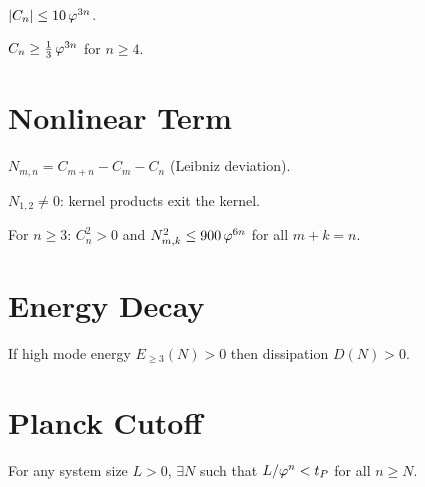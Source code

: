 \begin{theorem}
\label{thm:polynomial-growth}
$|C_n| \le 10\,\varphi^{3n}$.
\end{theorem}

\begin{theorem}
\label{thm:dissipation-lower-bound}
$C_n \ge \tfrac{1}{3}\,\varphi^{3n}$ for $n \ge 4$.
\end{theorem}

\section{Nonlinear Term}

\begin{definition}
\label{def:nonlinear-coeff}
$N_{m,n} = C_{m+n} - C_m - C_n$ (Leibniz deviation).
\end{definition}

\begin{theorem}
\label{thm:nonlinear-instability}
$N_{1,2} \ne 0$: kernel products exit the kernel.
\end{theorem}

\begin{theorem}
\label{thm:high-mode-dominance}
For $n \ge 3$: $C_n^2 > 0$ and $N_{m,k}^2 \le 900\,\varphi^{6n}$
for all $m + k = n$.
\end{theorem}

\section{Energy Decay}

\begin{theorem}
\label{thm:dissipation-strict-pos}
If high mode energy $E_{\ge 3}(N) > 0$ then
dissipation $D(N) > 0$.
\end{theorem}

\section{Planck Cutoff}

\begin{theorem}
\label{thm:planck-mode-cutoff}
For any system size $L > 0$, $\exists N$ such that
$L/\varphi^n < t_P$ for all $n \ge N$.
\end{theorem}

